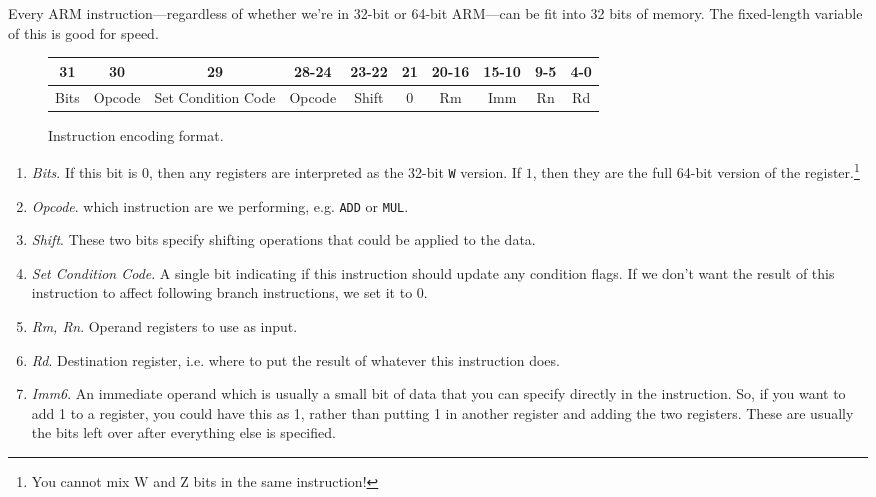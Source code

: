   \begin{definition}
    \label{def:instruction-syntax}
    Every ARM instruction---regardless of whether we're in 32-bit or 64-bit ARM---can be fit into 32 bits of memory. The fixed-length variable of this is good for speed.   
    
    \begin{figure}[H]
      \centering 
      \begin{tabular}{|c|c|c|c|c|c|c|c|c|c|}
      \hline
      \textbf{31} & \textbf{30} & \textbf{29} & \textbf{28-24} & \textbf{23-22} & \textbf{21} & \textbf{20-16} & \textbf{15-10} & \textbf{9-5} & \textbf{4-0} \\
      \hline
      Bits & Opcode & Set Condition Code & Opcode & Shift & 0 & Rm & Imm & Rn & Rd \\
      \hline
      \end{tabular}
      \caption{Instruction encoding format.} 
    \end{figure}

    \begin{enumerate}
      \item \textit{Bits}. If this bit is $0$, then any registers are interpreted as the 32-bit \texttt{W} version. If $1$, then they are the full 64-bit version of the register.\footnote{You cannot mix W and Z bits in the same instruction!}

      \item \textit{Opcode}. which instruction are we performing, e.g. \texttt{ADD} or \texttt{MUL}. 

      \item \textit{Shift}. These two bits specify shifting operations that could be applied to the data. 

      \item \textit{Set Condition Code}. A single bit indicating if this instruction should update any condition flags. If we don't want the result of this instruction to affect following branch instructions, we set it to $0$. 

      \item \textit{Rm, Rn}. Operand registers to use as input. 
        
      \item \textit{Rd}. Destination register, i.e. where to put the result of whatever this instruction does. 

      \item \textit{Imm6}. An immediate operand which is usually a small bit of data that you can specify directly in the instruction. So, if you want to add 1 to a register, you could have this as 1, rather than putting 1 in another register and adding the two registers. These are usually the bits left over after everything else is specified.
    \end{enumerate}
  \end{definition}

